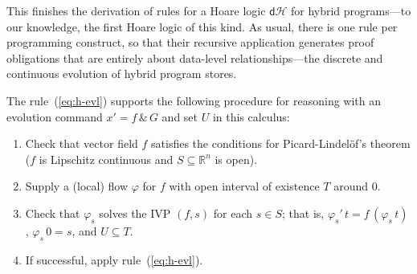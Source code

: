 \documentclass[envcountsame]{llncs}
\newcommand{\dH}{\mathsf{d}\mathcal{H}}
\newcommand{\flow}{\varphi}
\newcommand{\reals}{\mathbb{R}}
\begin{document}
This finishes the derivation of rules for a Hoare logic $\dH$ for
hybrid programs---to our knowledge, the first Hoare logic of this
kind. As usual, there is one rule per programming construct, so that
their recursive application generates proof obligations that are
entirely about data-level relationships---the discrete and continuous
evolution of hybrid program stores.

The rule~(\ref{eq:h-evl}) supports the following procedure
for reasoning with an evolution command $x' = f\, \&\, G$ and set $U$
in this calculus:
\begin{enumerate}
\item Check that vector field $f$ satisfies the conditions for
  Picard-Lindel\"of's theorem ($f$ is Lipschitz continuous and
  $S\subseteq\reals^n$ is open).
\item Supply a (local) flow $\flow$ for $f$ with open interval of
  existence $T$ around $0$.
\item Check that $\flow_s$ solves the IVP $(f,s)$ for each $s\in S$;
  that is, $\flow_s'\, t = f\, (\flow_s\, t)$, $\flow_s\, 0 = s$, and
  $U\subseteq T$.
\item If successful, apply rule~(\ref{eq:h-evl}).
\end{enumerate}
\end{document}
